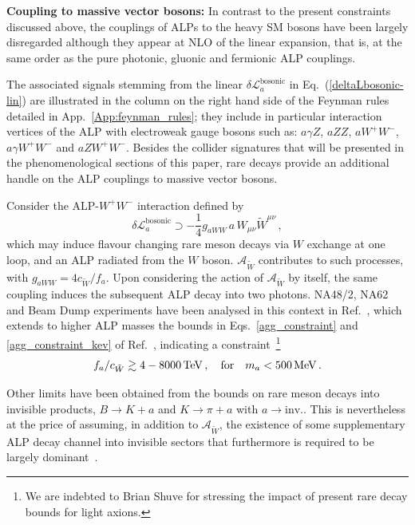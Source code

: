 \documentclass[11pt]{article}
\newcommand{\m}{\mu}
\renewcommand{\m}{\mu}
\newcommand{\n}{\nu}
\newcommand{\A}{\mathcal{A}}
\newcommand{\Wt}{{\tilde{W}}}
\renewcommand{\to}{\rightarrow}
\newcommand{\beq}{\begin{equation}}
\newcommand{\eeq}{\end{equation}}
\renewcommand{\[}{\begin{equation}}
\renewcommand{\]}{\end{equation}}
\newcommand{\LL}{\mathscr{L}}
\begin{document}
\vspace{0.3cm}

{\bf Coupling to massive vector bosons: } In contrast to the present constraints  discussed above, the couplings of ALPs  to the heavy SM bosons 
have been largely disregarded although they appear at  NLO of the linear expansion, that is, at the same order as the pure photonic, gluonic and fermionic ALP couplings. 


The associated signals stemming from the linear $\delta\LL_a^\text{bosonic}$ in Eq.~(\ref{deltaLbosonic-lin}) 
are illustrated  in the column on the right hand side of the Feynman rules detailed in App.~\ref{App:feynman_rules}; they   
include in particular interaction vertices of the ALP with electroweak gauge bosons such as:  $a\gamma Z$, $aZZ$,  $aW^+W^-$, $a\gamma W^+W^-$ and $aZW^+W^-$. Besides the collider signatures that will be presented in the phenomenological sections of this paper, rare  decays provide an additional handle on the ALP couplings to massive vector bosons.

Consider the ALP-$W^+W^-$ interaction defined by
\beq
 \delta\LL_a^{\text{bosonic}} \supset  - \frac{1}{4}g_{a WW} \,a\,W_{\m\n}\tilde{W}^{\m\n}\,,
 \label{gaWW-def}
 \eeq
   which  may induce flavour changing rare meson decays via $W$ exchange at one loop, and an ALP radiated from the $W$ boson.
 $\A_\Wt$ contributes to such processes, with  $g_{a W W}=4 c_\Wt / f_a$. Upon considering the action of $\A_\Wt$  by itself, the same coupling 
 induces the subsequent ALP decay into two photons. NA48/2, NA62 and Beam Dump experiments  have been analysed in this 
 context in Ref.~\cite{Izaguirre:2016dfi},  which extends to higher ALP masses the bounds in Eqs.~\eqref{agg_constraint} and \eqref{agg_constraint_kev} of 
 Ref.~\cite{Mimasu:2014nea}, indicating a constraint~\footnote{We are indebted to Brian Shuve for stressing the impact of present rare decay bounds for light axions.}
\beq
 f_a/c_{\tilde W} \gtrsim \unit[4-8000]{TeV}\,,\quad \text{for}\quad m_a < \unit[500]{MeV}\,. \label{rarebound}
\eeq


Other limits have been obtained from the bounds on rare meson decays  into invisible products, $B \to K + a$ and $K \to \pi + a$ with $a\to \text{inv.}$. This is 
nevertheless at the price of assuming, in addition to $\A_\Wt$, the existence of some supplementary ALP decay channel into invisible sectors that furthermore is required 
to be largely dominant~\cite{Izaguirre:2016dfi}.
\end{document}
